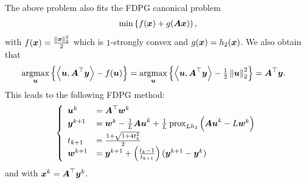  The above problem also fits the FDPG canonical problem 
 \begin{align*}
 	\min \left\{ f(\boldsymbol x) + g(\boldsymbol{Ax})\right),
 \end{align*}
 with $f(\boldsymbol x)=\frac{\|\boldsymbol x \|^2_2}{2}$ which is $1$-strongly convex and $g(\boldsymbol x)=h_2(\boldsymbol x)$. We also obtain that
 \begin{align*}
	\underset{\boldsymbol u}{\text{argmax}} \left\{\left \langle \boldsymbol u, \boldsymbol A^\top \boldsymbol y \right \rangle - f(\boldsymbol u)\right\} &= \underset{\boldsymbol u}{\text{argmax}} \left\{\left \langle \boldsymbol u, \boldsymbol A^\top \boldsymbol y \right \rangle - {\textstyle\frac{1}{2}}\left\lVert\boldsymbol u\right\rVert_{2}^2 \right\} = \boldsymbol A^\top \boldsymbol y. 
\end{align*}
This leads to the following FDPG method:
     \begin{align*}
    \begin{split}
    \left\{
    \begin{array}{ll}
         \boldsymbol u^{k} &= \boldsymbol A^\top \boldsymbol w^k\\
        \boldsymbol y^{k+1} &= \boldsymbol w^k-{\textstyle\frac{1}{L}} \boldsymbol{Au}^k + {\textstyle\frac{1}{L}} \operatorname{prox}_{Lh_2}\left(\boldsymbol{Au}^k-L\boldsymbol w^k\right) \\
        t_{k+1} &= \frac{1+\sqrt{1+4t_k^2}}{2} \\
        \boldsymbol w^{k+1} &= \boldsymbol y^{k+1} + \left( 
        \frac{t_k-1}{t_{k+1}} \right) (\boldsymbol y^{k+1}- \boldsymbol y^k)
    \end{array}
    \right.
    \end{split}
    \end{align*}
    and with  $\boldsymbol x^k = \boldsymbol A^\top \boldsymbol y^k$.
    
